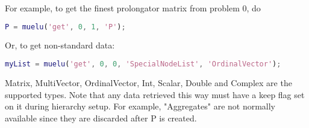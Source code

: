 For example, to get the finest prolongator matrix from problem 0, do

\begin{lstlisting}[language=Matlab]
    P = muelu('get', 0, 1, 'P');
\end{lstlisting}

Or, to get non-standard data:
    
\begin{lstlisting}[language=Matlab]
    myList = muelu('get', 0, 0, 'SpecialNodeList', 'OrdinalVector');
\end{lstlisting}

Matrix, MultiVector, OrdinalVector, Int, Scalar, Double and Complex are the supported types.
Note that any data retrieved this way must have a keep flag set on it during hierarchy setup.
For example, "Aggregates" are not normally available since they are discarded after P is created.
